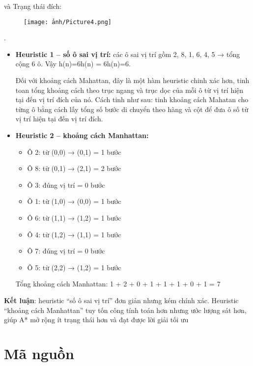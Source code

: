 \documentclass{article}
\begin{document}
và Trạng thái đích:

\begin{figure}[h!]
\centering
\texttt{[image: ảnh/Picture4.png]}
\end{figure}.


\begin{itemize}
    \item \textbf{Heuristic 1 – số ô sai vị trí:} các ô sai vị trí gồm 2, 8, 1, 6, 4, 5 → tổng cộng 6 ô. Vậy h(n)=6h(n) = 6h(n)=6.


    Đối với khoảng cách Mahattan, đây là một hàm heuristic chinh xác hơn, tinh toan tổng khoảng cách theo trục ngang và trục dọc của mỗi ô từ vị trí hiện tại đến vị trí đích của nó. Cách tinh như sau: tinh khoảng cách Mahatan cho từng ô bằng cách lấy tổng số bước di chuyển theo hàng và cột để đưa ô số từ vị trí hiện tại đến vị trí đích.

    \item \textbf{Heuristic 2 – khoảng cách Manhattan:}
\begin{itemize}
    \item Ô 2: từ (0,0) → (0,1) = 1 bước
    \item Ô 8: từ (0,1) → (2,1) = 2 bước
    \item Ô 3: đúng vị trí = 0 bước
    \item Ô 1: từ (1,0) → (0,0) = 1 bước
    \item Ô 6: từ (1,1) → (1,2) = 1 bước
    \item Ô 4: từ (1,2) → (1,1) = 1 bước
    \item Ô 7: đúng vị trí = 0 bước
    \item Ô 5: từ (2,2) → (1,2) = 1 bước

    \end{itemize}

    Tổng khoảng cách Manhattan: 1 + 2 + 0 + 1 + 1 + 1 + 0 + 1 = 7

\end{itemize}

\textbf{Kết luận}: heuristic “số ô sai vị trí” đơn giản nhưng kém chính xác. Heuristic “khoảng cách Manhattan” tuy tốn công tính toán hơn nhưng ước lượng sát hơn, giúp A* mở rộng ít trạng thái hơn và đạt được lời giải tối ưu

\section{Mã nguồn}
\end{document}
